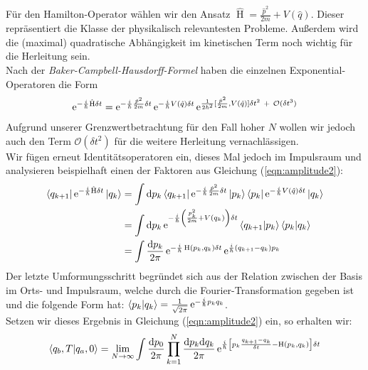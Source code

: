 Für den Hamilton-Operator wählen wir den Ansatz $\hat{\operatorname{H}} = \frac{\hat{p}^2}{2m} + V(\hat{q})$. Dieser repräsentiert die Klasse der physikalisch relevantesten Probleme. Außerdem wird die (maximal) quadratische Abhängigkeit im kinetischen Term noch wichtig für die Herleitung sein.\\
Nach der \textit{Baker-Campbell-Hausdorff-Formel} haben die einzelnen Exponential-Operatoren die Form
\begin{align}
	\operatorname{e}^{-\frac{i}{\hbar}\hat{\operatorname{H}}\delta t} = \operatorname{e}^{-\frac{i}{\hbar}\frac{\hat{p}^2}{2m}\delta t}\operatorname{e}^{-\frac{i}{\hbar} V(\hat{q})\delta t}\operatorname{e}^{\frac{1}{2\hbar^2}[\frac{\hat{p}^2}{2m},V(\hat{q})]\delta t^2 \ + \ \mathcal{O}(\delta t^3)} 
\end{align}
Aufgrund unserer Grenzwertbetrachtung für den Fall hoher $N$ wollen wir jedoch auch den Term $\mathcal{O}(\delta t^2)$ für die weitere Herleitung vernachlässigen. \\
Wir fügen erneut Identitätsoperatoren ein, dieses Mal jedoch im Impulsraum und analysieren beispielhaft einen der Faktoren aus Gleichung (\ref{eqn:amplitude2}):
\begin{align}
	\bra{q_{k+1}}\operatorname{e}^{-\frac{i}{\hbar}\hat{\operatorname{H}}\delta t}\ket{q_k} &= \int \dd p_k \bra{q_{k+1}}\operatorname{e}^{-\frac{i}{\hbar}\frac{\hat{p}^2}{2m}\delta t}\ket{p_k}\bra{p_k}\operatorname{e}^{-\frac{i}{\hbar} V(\hat{q})\delta t}\ket{q_k} \nonumber \\
	&= \int \dd p_k \operatorname{e}^{-\frac{i}{\hbar}\left(\frac{p_k^2}{2m} +V(q_k)\right)\delta t}\bra{q_{k+1}}\ket{p_k}\bra{p_k}\ket{q_k} \nonumber \\
	&= \int \frac{\dd p_k}{2\pi} \operatorname{e}^{-\frac{i}{\hbar} \operatorname{H}(p_k,q_k)\delta t} \operatorname{e}^{\frac{i}{\hbar}(q_{k+1}-q_k)p_k}
\end{align}
Der letzte Umformungsschritt begründet sich aus der Relation zwischen der Basis im Orts- und Impulsraum, welche durch die Fourier-Transformation gegeben ist und die folgende Form hat: $\braket{p_k}{q_k} = \frac{1}{\sqrt{2\pi}} \operatorname{e}^{-\frac{i}{\hbar} p_kq_k}$. \\
Setzen wir dieses Ergebnis in Gleichung (\ref{eqn:amplitude2}) ein, so erhalten wir: 
\begin{align}
	\braket{q_b,T}{q_a,0} = \lim_{N\rightarrow\infty} \int \frac{\dd p_0}{2\pi} \prod_{k=1}^N \frac{\dd p_k\dd q_k}{2\pi} \operatorname{e}^{\frac{i}{\hbar}\left[p_k\frac{q_{k+1}-q_k}{\delta t} - \operatorname{H}(p_k,q_k)\right]\delta t}
\end{align}
